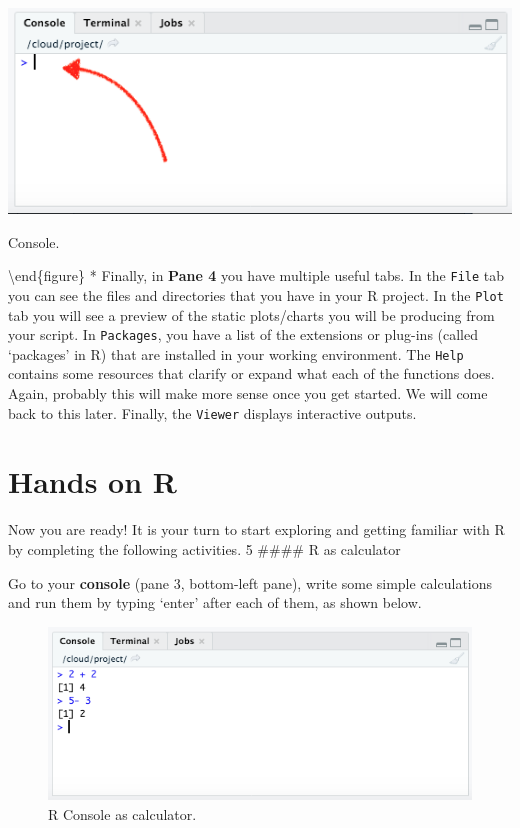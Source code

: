 \documentclass[
]{book}
\begin{document}
\includegraphics[width=1\linewidth]{./images/rstudio_cloud_console} \hfill{}

\caption{Console.}

\label{fig:unnamed-chunk-8}
\textbackslash end\{figure\}
* Finally, in \textbf{Pane 4} you have multiple useful tabs. In the \texttt{File} tab you can see the files and directories that you have in your R project. In the \texttt{Plot} tab you will see a preview of the static plots/charts you will be producing from your script. In \texttt{Packages}, you have a list of the extensions or plug-ins (called `packages' in R) that are installed in your working environment. The \texttt{Help} contains some resources that clarify or expand what each of the functions does. Again, probably this will make more sense once you get started. We will come back to this later. Finally, the \texttt{Viewer} displays interactive outputs.

\hypertarget{hands-on-r}{%
\section{Hands on R}\label{hands-on-r}}

Now you are ready! It is your turn to start exploring and getting familiar with R by completing the following activities.
5
\#\#\#\# R as calculator

Go to your \textbf{console} (pane 3, bottom-left pane), write some simple calculations and run them by typing `enter' after each of them, as shown below.

\begin{figure}

\includegraphics[width=1\linewidth]{./images/rstudio_cloud_r_as_calculator} \hfill{}

\caption{R Console as calculator.}\label{fig:unnamed-chunk-9}
\end{figure}
\end{document}
